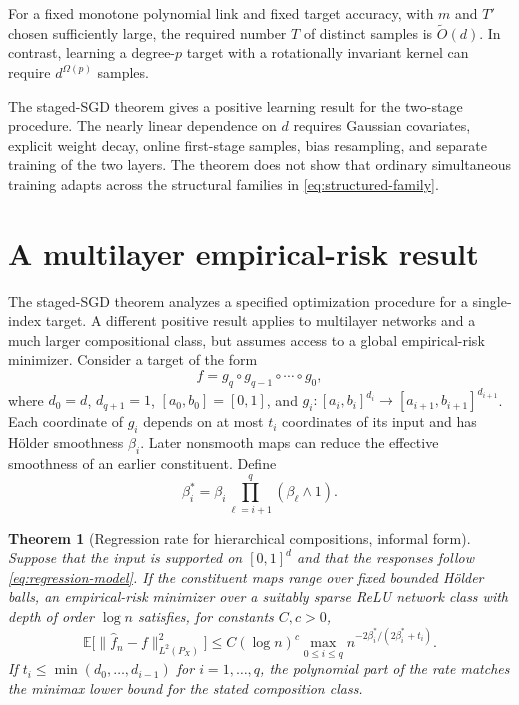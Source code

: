\documentclass[11pt,twoside]{article}
\newcommand{\E}{\mathbb E}
\newtheorem{theorem}{Theorem}[section]
\theoremstyle{definition}
\theoremstyle{remark}
\begin{document}
For a fixed monotone polynomial link and fixed target accuracy, with $m$ and
$T'$ chosen sufficiently large, the required number $T$ of distinct samples
is $\widetilde O(d)$. In contrast, learning a degree-$p$ target with a
rotationally invariant kernel can require $d^{\Omega(p)}$ samples.

The staged-SGD theorem gives a positive learning result for the two-stage
procedure. The
nearly linear dependence on \(d\) requires Gaussian covariates, explicit
weight decay, online first-stage samples, bias resampling, and separate
training of the two layers. The theorem does not show that ordinary
simultaneous training adapts across the structural families in
\cref{eq:structured-family}.

\section{A multilayer empirical-risk result}
\label{sec:multilayer-erm}

The staged-SGD theorem analyzes a specified optimization procedure for a
single-index target. A different positive result applies to multilayer
networks and a much larger compositional class, but assumes access to a global
empirical-risk minimizer. Consider a target of the form
\begin{equation}
 f=g_q\circ g_{q-1}\circ\cdots\circ g_0,
 \label{eq:hierarchical-composition}
\end{equation}
where $d_0=d$, $d_{q+1}=1$, $[a_0,b_0]=[0,1]$, and
$g_i:[a_i,b_i]^{d_i}\to[a_{i+1},b_{i+1}]^{d_{i+1}}$. Each coordinate of
\(g_i\) depends on at most \(t_i\) coordinates of its input and has
H\"older smoothness \(\beta_i\). Later nonsmooth maps can
reduce the effective smoothness of an earlier constituent. Define
\begin{equation}
 \beta_i^*=\beta_i\prod_{\ell=i+1}^{q}(\beta_\ell\wedge1).
 \label{eq:effective-composition-smoothness}
\end{equation}

\begin{theorem}[Regression rate for hierarchical compositions, informal form]
\label{thm:hierarchical-network-erm}
Suppose that the input is supported on $[0,1]^d$ and that the responses follow
\cref{eq:regression-model}. If the constituent maps range over fixed bounded
H\"older balls, an empirical-risk minimizer over a suitably sparse ReLU
network class with depth of order \(\log n\) satisfies, for constants
\(C,c>0\),
\begin{equation}
 \E\bigl[\|\widehat f_n-f\|_{L^2(P_X)}^2\bigr]
 \leq C(\log n)^c
 \max_{0\leq i\leq q}
 n^{-2\beta_i^*/(2\beta_i^*+t_i)}.
 \label{eq:composition-statistical-rate}
\end{equation}
If \(t_i\leq\min(d_0,\ldots,d_{i-1})\) for
\(i=1,\ldots,q\), the polynomial part of the rate matches the minimax lower
bound for the stated composition class.
\end{theorem}
\end{document}
